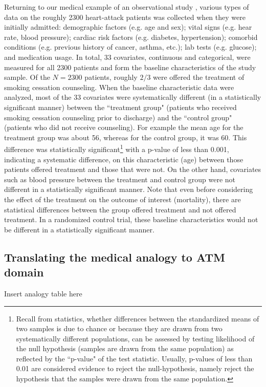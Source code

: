 \documentclass[11pt]{scrartcl}
\begin{document}
Returning to our medical example of an observational study \cite{austin2011tutorial}, various types of data on the roughly 2300 heart-attack patients was collected when they were initially admitted: demographic factors (e.g. age and sex); vital signs (e.g. hear rate, blood pressure); cardiac risk factors (e.g. diabetes, hypertension); comorbid conditions (e.g. previous history of cancer, asthma, etc.); lab tests (e.g. glucose); and medication usage.  In total, 33 covariates, continuous and categorical, were measured for all 2300 patients and form the baseline characteristics of the study sample.  Of the $N=2300$ patients, roughly $2/3$ were offered the treatment of smoking cessation counseling.  When the baseline characteristic data were analyzed, most of the 33 covariates were systematically different (in a statistically significant manner) between the ``treatment group" (patients who received smoking cessation counseling prior to discharge) and the ``control group" (patients who did not receive counseling).  For example the mean age for the treatment group was about 56, whereas for the control group, it was 60.  This difference was statistically significant\footnote{Recall from statistics, whether differences between the standardized means of two samples is due to chance or because they are drawn from two systematically different populations, can be assessed by testing likelihood of the null hypothesis (samples are drawn from the same population) as reflected by the ``p-value" of the test statistic.  Usually, p-values of less than 0.01 are considered evidence to reject the null-hypothesis, namely reject the hypothesis that the samples were drawn from the same population.} with a p-value of less than 0.001, indicating a systematic difference, on this characteristic (age) between those patients offered treatment and those that were not.  On the other hand, covariates such as blood pressure between the treatment and control group were not different in a statistically significant manner.  Note that even before considering the effect of the treatment on the outcome of interest (mortality), there are statistical differences between the group offered treatment and not offered treatment. In a randomized control trial, these baseline characteristics would not be different in a statistically significant manner.  

\subsection*{Translating the medical analogy to ATM domain}
Insert analogy table here
\end{document}
